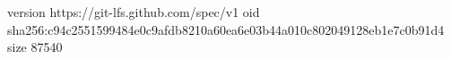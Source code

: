 version https://git-lfs.github.com/spec/v1
oid sha256:c94c2551599484e0c9afdb8210a60ea6e03b44a010c802049128eb1e7c0b91d4
size 87540

